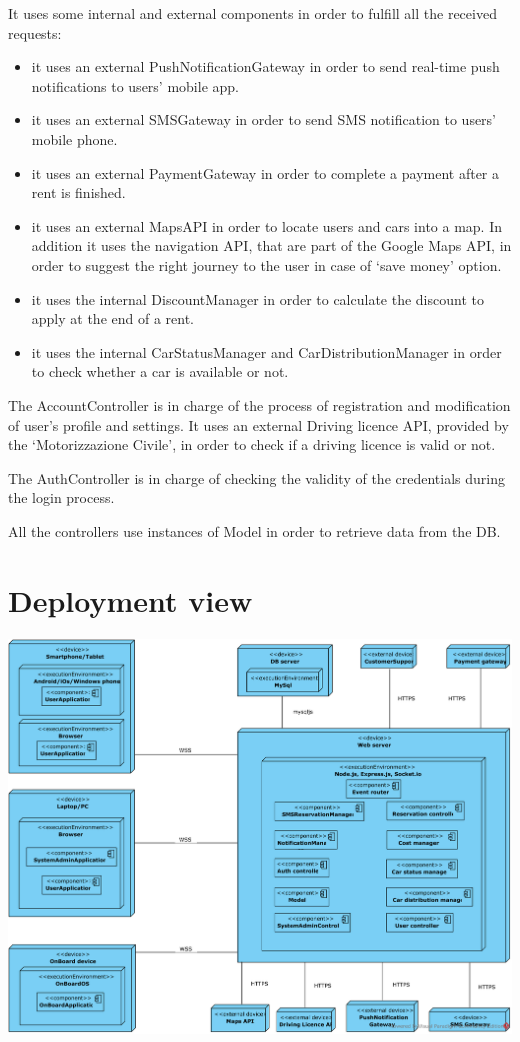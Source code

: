 It uses some internal and external components in order to fulfill all the received requests:
\begin{itemize}
\item it uses an external PushNotificationGateway in order to send real-time push notifications to users’ mobile app.
\item it uses an external SMSGateway in order to send SMS notification to users’ mobile phone.
\item it uses an external PaymentGateway in order to complete a payment after a rent is finished.
\item it uses an external MapsAPI in order to locate users and cars into a map. In addition it uses the navigation API, that are part of the Google Maps API, in order to suggest the right journey to the user in case of ‘save money’ option.
\item it uses the internal DiscountManager in order to calculate the discount to apply at the end of a rent.
\item it uses the internal CarStatusManager and CarDistributionManager in order to check whether a car is available or not.
\end{itemize}

The AccountController is in charge of the process of registration and modification of user’s profile and settings.
It uses an external Driving licence API, provided by the ‘Motorizzazione Civile’, in order to check if a driving licence is valid or not.

The AuthController is in charge of checking the validity of the credentials during the login process.

All the controllers use instances of Model in order to retrieve data from the DB.

\section{Deployment view}
\includegraphics[width=\textwidth, keepaspectratio]{../images/architectural_design/deployment_diagram.png}

